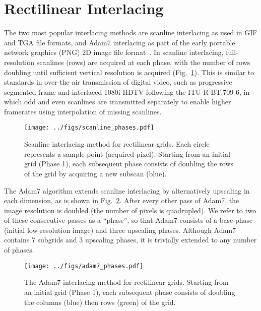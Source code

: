\documentclass{article}
\newcommand{\reffig}[1]{Fig.~\ref{fig:#1}}
\begin{document}
\section{Rectilinear Interlacing}
\label{sec:rect}

The two most popular interlacing methods are scanline interlacing as used in GIF and TGA file formats, and Adam7 interlacing as part of the early portable network graphics (PNG) 2D image file format~\citep{rfc2083}.
%
In scanline interlacing, full-resolution scanlines (rows) are acquired at each
phase, with the number of rows doubling until sufficient vertical resolution is
acquired (\reffig{scanlinephases}).
%
This is similar to standards in over-the-air transmission of digital video, such
as progressive segmented frame and interlaced 1080i HDTV following the ITU-R
BT.709-6, in which odd and even scanlines are transmitted separately to enable higher
framerates using interpolation of missing scanlines.

\begin{figure}[hb]
\centering
\texttt{[image: ../figs/scanline\_phases.pdf]}
\caption{\label{fig:scanlinephases}
    Scanline interlacing method for rectilinear grids.
    Each circle represents a sample point (acquired pixel).
    Starting from an initial grid (Phase 1), each subsequent phase consists of
    doubling the rows of the grid by acquiring a new subscan (blue).
	}
\end{figure}

The Adam7 algorithm extends scanline interlacing by alternatively upscaling in
each dimension, as is shown in \reffig{adam7phases}.
%
After every other pass of Adam7, the image resolution is doubled (the number of pixels is quadrupled).
%
We refer to two of these consecutive passes as a ``phase'', so that Adam7
consists of a base phase (initial low-resolution image) and three upscaling phases.
%
Although Adam7 contains 7 subgrids and 3 upscaling phases, it is trivially extended to any number of phases.


\begin{figure}[th]
\centering
\texttt{[image: ../figs/adam7\_phases.pdf]}
\caption{\label{fig:adam7phases}
The Adam7 interlacing method for rectilinear grids.
%
	Starting from an initial grid (Phase 1), each subsequent phase consists of doubling the columns (blue) then rows (green) of the grid.
	}
\end{figure}
\end{document}

